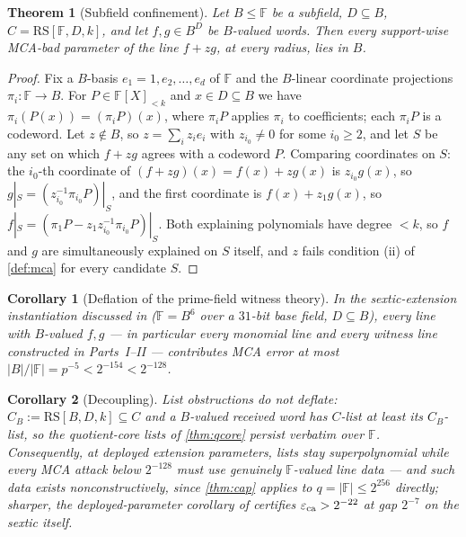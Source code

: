 \documentclass[11pt]{article}
\newtheorem{theorem}{Theorem}[section]
\newtheorem{corollary}[corollary]{Corollary}
\theoremstyle{definition}
\newcommand{\F}{\mathbb F}
\newcommand{\eps}{\varepsilon}
\newcommand{\RS}{\mathrm{RS}}
\newcommand{\eca}{\eps_{\rm ca}}
\begin{document}
\begin{theorem}[Subfield confinement]\label{thm:subfield}
Let $B\le\F$ be a subfield, $D\subseteq B$, $C=\RS[\F,D,k]$, and let $f,g\in B^D$ be $B$-valued words.  Then every support-wise MCA-bad parameter of the line $f+zg$, at every radius, lies in $B$.
\end{theorem}

\begin{proof}
Fix a $B$-basis $e_1=1,e_2,\dots,e_d$ of $\F$ and the $B$-linear coordinate projections $\pi_i:\F\to B$.  For $P\in\F[X]_{<k}$ and $x\in D\subseteq B$ we have $\pi_i(P(x))=(\pi_iP)(x)$, where $\pi_iP$ applies $\pi_i$ to coefficients; each $\pi_iP$ is a codeword.  Let $z\notin B$, so $z=\sum_iz_ie_i$ with $z_{i_0}\ne0$ for some $i_0\ge2$, and let $S$ be any set on which $f+zg$ agrees with a codeword $P$.  Comparing coordinates on $S$: the $i_0$-th coordinate of $(f+zg)(x)=f(x)+zg(x)$ is $z_{i_0}g(x)$, so $g|_S=(z_{i_0}^{-1}\pi_{i_0}P)|_S$, and the first coordinate is $f(x)+z_1g(x)$, so $f|_S=(\pi_1P-z_1z_{i_0}^{-1}\pi_{i_0}P)|_S$.  Both explaining polynomials have degree $<k$, so $f$ and $g$ are simultaneously explained on $S$ itself, and $z$ fails condition (ii) of \cref{def:mca} for every candidate $S$.
\end{proof}

\begin{corollary}[Deflation of the prime-field witness theory]\label{cor:deflate}
In the sextic-extension instantiation discussed in \cite{ABF26} ($\F=B^6$ over a $31$-bit base field, $D\subseteq B$), every line with $B$-valued $f,g$ --- in particular every monomial line and every witness line constructed in Parts~I--II --- contributes MCA error at most $|B|/|\F|=p^{-5}<2^{-154}<2^{-128}$.
\end{corollary}

\begin{corollary}[Decoupling]\label{cor:decouple}
List obstructions do not deflate: $C_B:=\RS[B,D,k]\subseteq C$ and a $B$-valued received word has $C$-list at least its $C_B$-list, so the quotient-core lists of \cref{thm:qcore} persist verbatim over $\F$.  Consequently, at deployed extension parameters, lists stay superpolynomial while every MCA attack below $2^{-128}$ must use genuinely $\F$-valued line data --- and such data exists nonconstructively, since \cref{thm:cap} applies to $q=|\F|\le2^{256}$ directly; sharper, the deployed-parameter corollary of \cite{UniversalCap} certifies $\eca>2^{-22}$ at gap $2^{-7}$ on the sextic itself.
\end{corollary}
\end{document}
